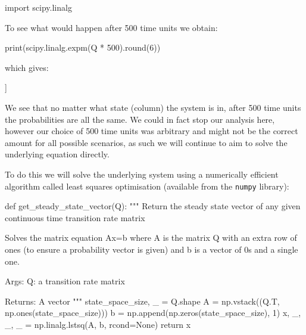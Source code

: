 \begin{pyin}
import scipy.linalg
\end{pyin}

To see what would happen after 500 time units we obtain:

\begin{pyin}
print(scipy.linalg.expm(Q * 500).round(6))
\end{pyin}

which gives:

\begin{pyout}
[[0.034309 0.085772 0.107215 0.134019 0.167524 0.209405 0.261756]
 [0.034309 0.085772 0.107215 0.134019 0.167524 0.209405 0.261756]
 [0.034309 0.085772 0.107215 0.134019 0.167524 0.209405 0.261756]
 [0.034309 0.085772 0.107215 0.134019 0.167524 0.209405 0.261756]
 [0.034309 0.085772 0.107215 0.134019 0.167524 0.209405 0.261756]
 [0.034309 0.085772 0.107215 0.134019 0.167524 0.209405 0.261756]
 [0.034309 0.085772 0.107215 0.134019 0.167524 0.209405 0.261756]]
\end{pyout}

We see that no matter what state (column) the system is in, after 500 time units
the probabilities are all the same. We could in fact stop our analysis here,
however our choice of 500 time units was arbitrary and might not be the correct
amount for all possible scenarios, as such we will continue to aim to solve the
underlying equation directly. %

To do this we will solve the underlying system using a numerically efficient
algorithm called least squares optimisation (available from the
\texttt{numpy} library):

\begin{pyin}
def get_steady_state_vector(Q):
    """
    Return the steady state vector of any given continuous time transition rate
    matrix

    Solves the matrix equation Ax=b where A is the matrix Q with an extra row of
    ones (to ensure a probability vector is given) and b is a vector of 0s and a
    single one.

    Args:
       Q: a transition rate matrix

    Returns:
        A vector
    """
    state_space_size, _ = Q.shape
    A = np.vstack((Q.T, np.ones(state_space_size)))
    b = np.append(np.zeros(state_space_size), 1)
    x, _, _, _ = np.linalg.lstsq(A, b, rcond=None)
    return x
\end{pyin}

